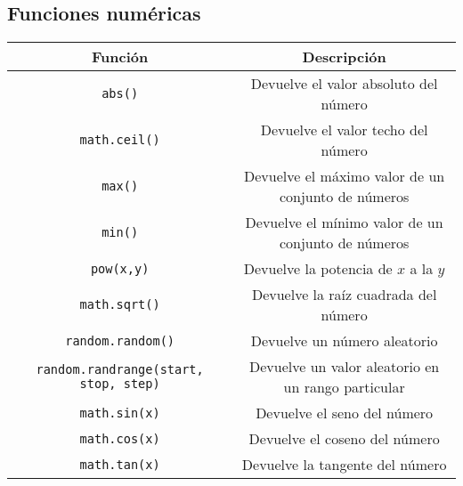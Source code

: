 	\subsection{Funciones numéricas}
	\begin{center}
		\begin{tabular}{|c|c|}
			\hline
			Función & Descripción \\
			\hline
			\texttt{abs()}& Devuelve el valor absoluto del número \\
			\hline
			\texttt{math.ceil()}& Devuelve el valor techo del número \\
			\hline
			\texttt{max()}& Devuelve el máximo valor de un conjunto de números \\
			\hline
			\texttt{min()}& Devuelve el mínimo valor de un conjunto de números \\
			\hline
			\texttt{pow(x,y)}& Devuelve la potencia de $ x $ a la $ y $ \\
			\hline
			\texttt{math.sqrt()}& Devuelve la raíz cuadrada del número \\
			\hline
			\texttt{random.random()}& Devuelve un número aleatorio \\
			\hline
			\texttt{random.randrange(start, stop, step)}& Devuelve un valor aleatorio en un rango particular \\
			\hline
			\texttt{math.sin(x)}& Devuelve el seno del número \\
			\hline
			\texttt{math.cos(x)}& Devuelve el coseno del número \\
			\hline
			\texttt{math.tan(x)}& Devuelve la tangente del número \\
			\hline
		\end{tabular}
	\end{center}
